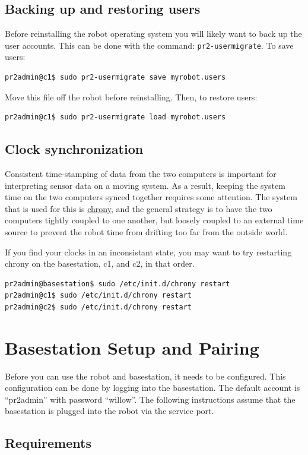 \subsection{Backing up and restoring users}
Before reinstalling the robot operating system you will likely want to
back up the user accounts. This can be done with the command:
\texttt{pr2-usermigrate}. To save users:
\begin{verbatim}
pr2admin@c1$ sudo pr2-usermigrate save myrobot.users
\end{verbatim}

Move this file off the robot before reinstalling.  Then, to restore users:
\begin{verbatim}
pr2admin@c1$ sudo pr2-usermigrate load myrobot.users
\end{verbatim}

\subsection{Clock synchronization}
Consistent time-stamping of data from the two computers is important
for interpreting sensor data on a moving system.  As a result, keeping
the system time on the two computers synced together requires some
attention.  The system that is used for this is
\href{http://chrony.tuxfamily.org/}{chrony}, and the general strategy
is to have the two computers tightly coupled to one another, but
loosely coupled to an external time source to prevent the robot time
from drifting too far from the outside world.

If you find your clocks in an inconsistant state, you may want to try
restarting chrony on the basestation, c1, and c2, in that order.
\begin{verbatim}
pr2admin@basestation$ sudo /etc/init.d/chrony restart
pr2admin@c1$ sudo /etc/init.d/chrony restart
pr2admin@c2$ sudo /etc/init.d/chrony restart
\end{verbatim}

\section{Basestation Setup and Pairing}
Before you can use the robot and basestation, it needs to be
configured.  This configuration can be done by logging into the
basestation.  The default account is ``pr2admin'' with password
``willow''.  The following instructions assume that the basestation is
plugged into the robot via the service port.

\subsection{Requirements}


